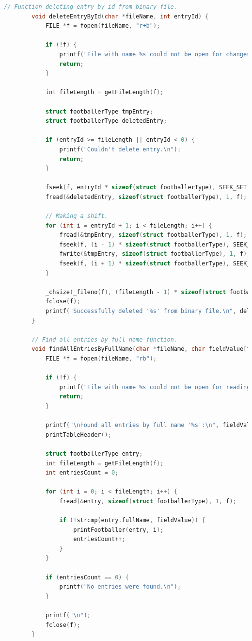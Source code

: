 \documentclass[12pt]{article}
\begin{document}
\begin{lstlisting}[language=C]
		// Function deleting entry by id from binary file.
		void deleteEntryById(char *fileName, int entryId) {
			FILE *f = fopen(fileName, "r+b");
			
			if (!f) {
				printf("File with name %s could not be open for changes.\n", fileName);
				return;
			}
			
			int fileLength = getFileLength(f);
			
			struct footballerType tmpEntry;
			struct footballerType deletedEntry;
			
			if (entryId >= fileLength || entryId < 0) {
				printf("Couldn't delete entry.\n");
				return;
			}
			
			fseek(f, entryId * sizeof(struct footballerType), SEEK_SET); // Move pointer on correct position.
			fread(&deletedEntry, sizeof(struct footballerType), 1, f); // Saving deleted entry.
			
			// Making a shift.
			for (int i = entryId + 1; i < fileLength; i++) {
				fread(&tmpEntry, sizeof(struct footballerType), 1, f);
				fseek(f, (i - 1) * sizeof(struct footballerType), SEEK_SET);
				fwrite(&tmpEntry, sizeof(struct footballerType), 1, f);
				fseek(f, (i + 1) * sizeof(struct footballerType), SEEK_SET);
			}
			
			_chsize(_fileno(f), (fileLength - 1) * sizeof(struct footballerType)); // Clip file.
			fclose(f);
			printf("Successfully deleted '%s' from binary file.\n", deletedEntry.fullName);
		}
		
		// Find all entries by full name function.
		void findAllEntriesByFullName(char *fileName, char fieldValue[fieldLength]) {
			FILE *f = fopen(fileName, "rb");
			
			if (!f) {
				printf("File with name %s could not be open for reading.\n", fileName);
				return;
			}
			
			printf("\nFound all entries by full name '%s':\n", fieldValue);
			printTableHeader();
			
			struct footballerType entry;
			int fileLength = getFileLength(f);
			int entriesCount = 0;
			
			for (int i = 0; i < fileLength; i++) {
				fread(&entry, sizeof(struct footballerType), 1, f);
				
				if (!strcmp(entry.fullName, fieldValue)) {
					printFootballer(entry, i);
					entriesCount++;
				}
			}
			
			if (entriesCount == 0) {
				printf("No entries were found.\n");
			}
			
			printf("\n");
			fclose(f);
		}
		

\end{lstlisting}
\end{document}
